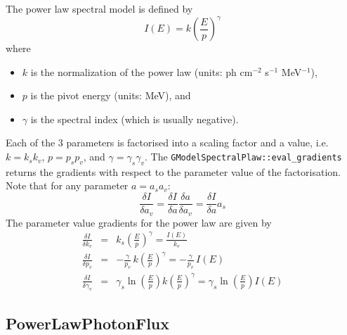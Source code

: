 \documentclass{article}[12pt,a4]
\begin{document}
The power law spectral model is defined by
\begin{equation}
I(E) = k \left( \frac{E}{p} \right)^{\gamma}
\end{equation}
where
\begin{itemize}
\item $k$ is the normalization of the power law (units: ph cm$^{-2}$ s$^{-1}$ MeV$^{-1}$),
\item $p$ is the pivot energy (units: MeV), and
\item $\gamma$ is the spectral index (which is usually negative).
\end{itemize}

Each of the 3 parameters is factorised into a scaling factor and a value, i.e.
$k=k_s k_v$, $p=p_s p_v$, and $\gamma = \gamma_s \gamma_v$.
The {\tt GModelSpectralPlaw::eval\_gradients} returns the gradients with
respect to the parameter value of the factorisation.
Note that for any parameter $a=a_s a_v$:
\begin{equation}
\frac{\delta I}{\delta a_v} = \frac{\delta I}{\delta a} \frac{\delta a}{\delta a_v} =
  \frac{\delta I}{\delta a} a_s
\end{equation}
The parameter value gradients for the power law are given by
\begin{eqnarray}
\frac{\delta I}{\delta k_v} & = & 
  k_s \left( \frac{E}{p} \right)^{\gamma} = \frac{I(E)}{k_v} \\
\frac{\delta I}{\delta p_v} & = & 
  -\frac{\gamma}{p_v} \, k \left( \frac{E}{p} \right)^{\gamma} =
  -\frac{\gamma}{p_v} \, I(E) \\
\frac{\delta I}{\delta \gamma_v} & = &
  \gamma_s \ln \left( \frac{E}{p} \right) k \left( \frac{E}{p} \right)^{\gamma} =
  \gamma_s \ln \left( \frac{E}{p} \right) I(E)
\end{eqnarray}


\subsection{PowerLawPhotonFlux}
\end{document}
